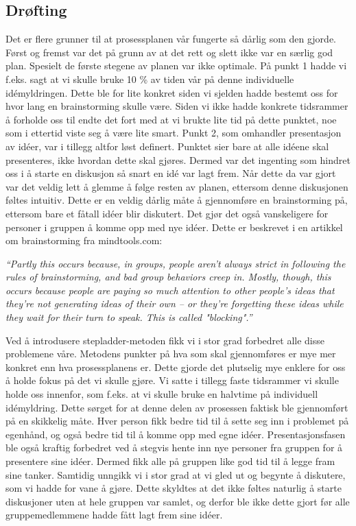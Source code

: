 \subsection{Drøfting}
Det er flere grunner til at prosessplanen vår fungerte så dårlig som den gjorde. Først og fremst var det på grunn av at det rett og slett ikke var en særlig god plan. Spesielt de første stegene av planen var ikke optimale. På punkt 1 hadde vi f.eks. sagt at vi skulle bruke 10 \% av tiden vår på denne individuelle idémyldringen. Dette ble for lite konkret siden vi sjelden hadde bestemt oss for hvor lang en brainstorming skulle være. Siden vi ikke hadde konkrete tidsrammer å forholde oss til endte det fort med at vi brukte lite tid på dette punktet, noe som i ettertid viste seg å være lite smart. Punkt 2, som omhandler presentasjon av idéer, var i tillegg altfor løst definert. Punktet sier bare at alle idéene skal presenteres, ikke hvordan dette skal gjøres. Dermed var det ingenting som hindret oss i å starte en diskusjon så snart en idé var lagt frem. Når dette da var gjort var det veldig lett å glemme å følge resten av planen, ettersom denne diskusjonen føltes intuitiv. Dette er en veldig dårlig måte å gjennomføre en brainstorming på, ettersom bare et fåtall idéer blir diskutert. Det gjør det også vanskeligere for personer i gruppen å komme opp med nye idéer. Dette er beskrevet i en artikkel om brainstorming fra mindtools.com\cite{brainstorming}: \newline

\emph{“Partly this occurs because, in groups, people aren’t always strict in following the rules of brainstorming, and bad group behaviors creep in. Mostly, though, this occurs because people are paying so much attention to other people’s ideas that they're not generating ideas of their own – or they're forgetting these ideas while they wait for their turn to speak. This is called "blocking".”} \newline

Ved å introdusere stepladder-metoden fikk vi i stor grad forbedret alle disse problemene våre. Metodens punkter på hva som skal gjennomføres er mye mer konkret enn hva prosessplanens er. Dette gjorde det plutselig mye enklere for oss å holde fokus på det vi skulle gjøre. Vi satte i tillegg faste tidsrammer vi skulle holde oss innenfor, som f.eks. at vi skulle bruke en halvtime på individuell idémyldring. Dette sørget for at denne delen av prosessen faktisk ble gjennomført på en skikkelig måte. Hver person fikk bedre tid til å sette seg inn i problemet på egenhånd, og også bedre tid til å komme opp med egne idéer. Presentasjonsfasen ble også kraftig forbedret ved å stegvis hente inn nye personer fra gruppen for å presentere sine idéer. Dermed fikk alle på gruppen like god tid til å legge fram sine tanker. Samtidig unngikk vi i stor grad at vi gled ut og begynte å diskutere, som vi hadde for vane å gjøre. Dette skyldtes at det ikke føltes naturlig å starte diskusjoner uten at hele gruppen var samlet, og derfor ble ikke dette gjort før alle gruppemedlemmene hadde fått lagt frem sine idéer. 
